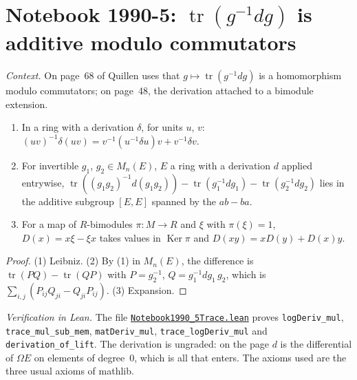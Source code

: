 \section[Notebook 1990-5: $\mathrm{tr}(g^{-1}dg)$ modulo commutators]{Notebook 1990-5: $\operatorname{tr}(g^{-1}dg)$ is additive modulo commutators\protect{}}\label{sec:quillen-1990-5-trace}

\emph{Context.} On page~68 of  Quillen uses that $g \mapsto \operatorname{tr}(g^{-1}dg)$ is a homomorphism modulo commutators; on page~48, the derivation attached to a bimodule extension.

\begin{encadre}
\begin{theoreme}\label{thm:quillen-1990-5-trace}\leavevmode
\begin{enumerate}
\item In a ring with a derivation $\delta$, for units $u$, $v$: $(uv)^{-1}\delta(uv) = v^{-1}(u^{-1}\delta u)v + v^{-1}\delta v$.
\item For invertible $g_1$, $g_2 \in M_n(E)$, $E$ a ring with a derivation $d$ applied entrywise, $\operatorname{tr}((g_1g_2)^{-1}d(g_1g_2)) - \operatorname{tr}(g_1^{-1}dg_1) - \operatorname{tr}(g_2^{-1}dg_2)$ lies in the additive subgroup $[E, E]$ spanned by the $ab - ba$.
\item For a map of $R$-bimodules $\pi : M \to R$ and $\xi$ with $\pi(\xi) = 1$, $D(x) = x\xi - \xi x$ takes values in $\operatorname{Ker}\pi$ and $D(xy) = xD(y) + D(x)y$.
\end{enumerate}
\end{theoreme}
\end{encadre}

\begin{proof}
(1) Leibniz. (2) By (1) in $M_n(E)$, the difference is $\operatorname{tr}(PQ) - \operatorname{tr}(QP)$ with $P = g_2^{-1}$, $Q = g_1^{-1}dg_1\,g_2$, which is $\sum_{i,j}(P_{ij}Q_{ji} - Q_{ji}P_{ij})$. (3) Expansion.
\end{proof}

\emph{Verification in Lean.} The file \href{\leanblobmain/Notebook1990_5Trace.lean}{\texttt{Notebook1990\_5Trace.\allowbreak{}lean}} proves \texttt{logDeriv\_mul}, \texttt{trace\_mul\_sub\_mem}, \texttt{matDeriv\_mul}, \texttt{trace\_logDeriv\_mul} and \texttt{derivation\_of\_lift}. The derivation is ungraded: on the page $d$ is the differential of $\Omega E$ on elements of degree~$0$, which is all that enters. The axioms used are the three usual axioms of mathlib.

